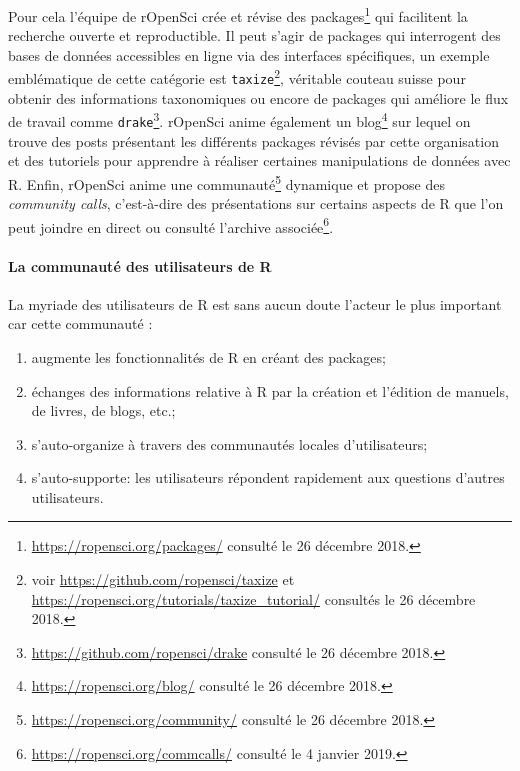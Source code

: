 \documentclass[]{article}
\providecommand{\tightlist}{%
  \setlength{\itemsep}{0pt}\setlength{\parskip}{0pt}}
\let\oldparagraph\paragraph
\renewcommand{\paragraph}[1]{\oldparagraph{#1}\mbox{}}
\begin{document}
Pour cela l'équipe de rOpenSci crée et révise des packages\footnote{\url{https://ropensci.org/packages/} consulté le 26 décembre 2018.} qui facilitent la recherche ouverte et reproductible. Il peut s'agir de packages qui interrogent des bases de données accessibles en ligne via des interfaces spécifiques, un exemple emblématique de cette catégorie est \texttt{taxize}\footnote{voir \url{https://github.com/ropensci/taxize} et \url{https://ropensci.org/tutorials/taxize_tutorial/} consultés le 26 décembre 2018.}, véritable couteau suisse pour obtenir des informations taxonomiques
ou encore de packages qui améliore le flux de travail comme \texttt{drake}\footnote{\url{https://github.com/ropensci/drake} consulté le 26 décembre 2018.}. rOpenSci anime également un blog\footnote{\url{https://ropensci.org/blog/} consulté le 26 décembre 2018.} sur lequel on trouve des posts présentant les différents packages révisés par cette organisation et des tutoriels pour apprendre à réaliser certaines manipulations de données avec R. Enfin, rOpenSci anime une communauté\footnote{\url{https://ropensci.org/community/} consulté le 26 décembre 2018.} dynamique et propose des \emph{community calls}, c'est-à-dire des présentations sur certains aspects de R que l'on peut joindre en direct ou consulté l'archive associée\footnote{\url{https://ropensci.org/commcalls/} consulté le 4 janvier 2019.}.

\hypertarget{la-communautuxe9-des-utilisateurs-de-r}{%
\paragraph{La communauté des utilisateurs de R}\label{la-communautuxe9-des-utilisateurs-de-r}}

La myriade des utilisateurs de R est sans aucun doute l'acteur le plus important
car cette communauté :

\begin{enumerate}
\def\labelenumi{\arabic{enumi}.}
\tightlist
\item
  augmente les fonctionnalités de R en créant des packages;
\item
  échanges des informations relative à R par la création et l'édition de manuels, de livres, de blogs, etc.;
\item
  s'auto-organize à travers des communautés locales d'utilisateurs;
\item
  s'auto-supporte: les utilisateurs répondent rapidement aux questions d'autres utilisateurs.
\end{enumerate}
\end{document}
